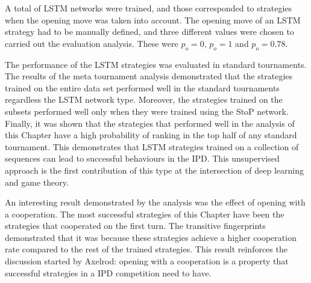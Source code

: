 A total of \lstmnetworks LSTM networks were trained, and those corresponded to
\lstmstrategies strategies when the opening move was taken into account. The
opening move of an LSTM strategy had to be manually defined, and three different
values were chosen to carried out the evaluation analysis. These were \(p_o=0\),
\(p_o=1\) and \(p_o=0.78\).

The performance of the \lstmstrategies LSTM strategies was evaluated in
\metatournamentslstm standard tournaments. The results of the meta tournament
analysis demonstrated that the strategies trained on the entire data set
performed well in the \metatournamentslstm standard tournaments regardless the
LSTM network type. Moreover, the strategies trained on the subsets
performed well only when they were trained using the StoP network. Finally, it
was shown that the strategies that performed well in the analysis of this
Chapter have a high probability of ranking in the top half of any standard
tournament. This demonstrates that LSTM strategies trained on a collection of
sequences can lead to successful behaviours in the IPD. This unsupervised approach is the 
first contribution of this 
type at the intersection of deep learning and game theory.

An interesting result demonstrated by the analysis was the effect of opening
with a cooperation. The most successful strategies of this Chapter have been the
strategies that cooperated on the first turn. The transitive
fingerprints demonstrated that it was because these strategies achieve a higher
cooperation rate compared to the rest of the trained strategies. This result
reinforces the discussion started by Axelrod: opening with a cooperation is a
property that successful strategies in a IPD competition need to have.
